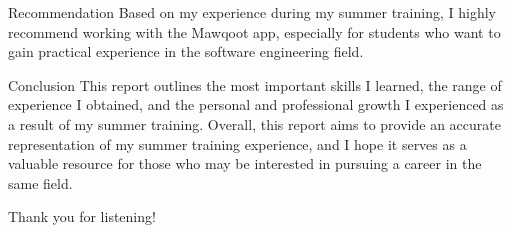 \documentclass{loyola-beamer}
\begin{document}
\begin{frame}{Recommendation}
	Based on my experience during my summer training, I highly recommend working
	with the Mawqoot app, especially for students who want to gain practical
	experience in the software engineering field.
\end{frame}

\begin{frame}{Conclusion}
	This report outlines the most important skills I learned, the range of experience
	I obtained, and the personal and professional growth I experienced as a result of
	my summer training. Overall, this report aims to provide an accurate representation
	of my summer training experience, and I hope it serves as a valuable resource for those
	who may be interested in pursuing a career in the same field.
\end{frame}


\begin{titleframe}{Thank you for listening!}
\end{titleframe}
\end{document}
